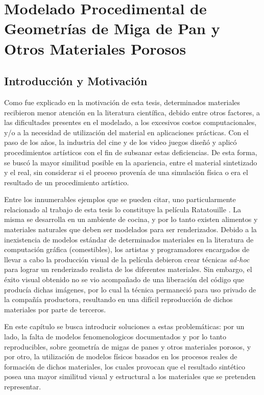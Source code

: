 \chapter[Modelado de la Geometría de Miga de Pan]{Modelado Procedimental de Geometrías de Miga de Pan y Otros Materiales Porosos}

\section{Introducción y Motivación} %
Como fue explicado en la motivación de esta tesis, determinados materiales recibieron menor atención en la literatura científica, debido entre otros factores, a las dificultades presentes	 en el modelado, a los excesivos costos computacionales, y/o a la necesidad de utilización del material en aplicaciones prácticas.
Con el paso de los a\~nos, la industria del cine y de los video juegos diseñó y aplicó procedimientos artísticos con el fin de subsanar estas deficiencias.
De esta forma, se busc\'o la mayor similitud posible en la apariencia, entre el material sintetizado y el real, sin considerar si el proceso provenía de una simulación física o era el resultado de un procedimiento artístico.

Entre los innumerables ejemplos que se pueden citar, uno particularmente relacionado al trabajo de esta tesis lo constituye la película Ratatouille \cite{Cho2007}.
La misma se desarrolla en un ambiente de cocina, y por lo tanto existen alimentos y materiales naturales que deben ser modelados para ser renderizados.
Debido a la inexistencia de modelos estándar de determinados materiales en la literatura de computación gráfica (comestibles), los artistas y programadores encargados de llevar a cabo la producción visual de la película debieron crear técnicas {\em ad-hoc} para lograr un renderizado realista de los diferentes materiales.
Sin embargo, el éxito visual obtenido no se vio acompañado de una liberación del código que producía dichas imágenes, por lo cual la técnica permaneció para uso privado de la compañía productora, resultando en una difícil reproducción de dichos materiales por parte de terceros.

En este capítulo se busca introducir soluciones a estas problemáticas: por un lado, la falta de modelos fenomenologicos documentados y por lo tanto reproducibles, sobre geometría de migas de panes y otros materiales porosos, y por otro, la utilización de modelos físicos basados en los procesos reales de formación de dichos materiales, los cuales provocan que el resultado sintético posea una mayor similitud visual y estructural a los materiales que se pretenden representar.

